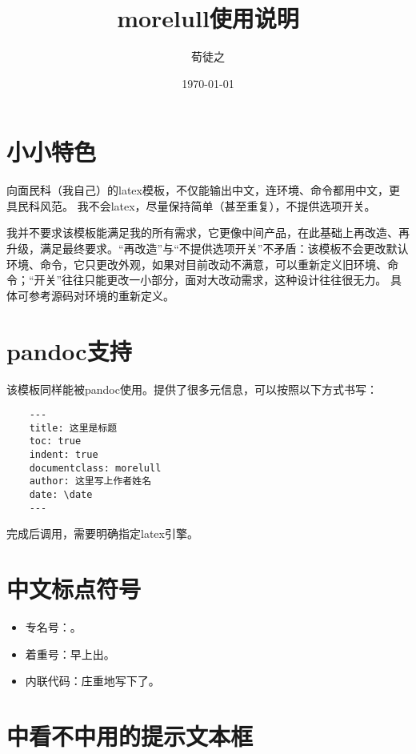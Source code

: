 \documentclass{morelull}
\title{morelull使用说明}
\author{荀徒之}
\date{\today}
\begin{document}
\maketitle
\tableofcontents

\section{小小特色}
向面民科（我自己）的latex模板，不仅能输出中文，连环境、命令都用中文，更具民科风范。
我不会latex，尽量保持简单（甚至重复），不提供选项开关。

我并不要求该模板能满足我的所有需求，它更像中间产品，在此基础上再改造、再升级，满足最终要求。“再改造”与“不提供选项开关”不矛盾：该模板不会更改默认环境、命令，它只更改外观，如果对目前改动不满意，可以重新定义旧环境、命令；“开关”往往只能更改一小部分，面对大改动需求，这种设计往往很无力。
具体可参考源码对环境的重新定义。

\section{pandoc支持}

该模板同样能被pandoc使用。提供了很多元信息，可以按照以下方式书写：

\begin{lstlisting}
    ---
    title: 这里是标题
    toc: true
    indent: true
    documentclass: morelull
    author: 这里写上作者姓名
    date: \date
    ---
\end{lstlisting}

完成后调用，需要明确指定latex引擎。

\section{中文标点符号}

\begin{itemize}
\item{专名号：。}
\item{着重号：早上出。}
\item{内联代码：庄重地写下了。}
\end{itemize}

\section{中看不中用的提示文本框}
\end{document}
